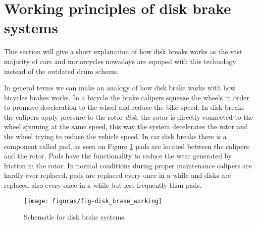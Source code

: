 \section{Working principles of disk brake systems}

		This section will give a short explanation of how disk breaks works as the vast majority of cars and motorcycles nowadays are equiped with this technology instead of the outdated drum scheme.
		\par
		In general terms we can make an analogy of how disk brake works with how bicycles brakes works. In a bicycle the brake calipers squeeze the wheels in order to promove deceleration to the wheel and reduce the bike speed. In disk breaks the calipers apply pressure to the rotor \textit{disk}, the rotor is directly connected to the wheel spinning at the same speed, this way the system decelerates the rotor and the wheel trying to reduce the vehicle speed. In car disk breaks there is a component called pad, as seen on Figure \ref{fig:working-of-disk-breaks} pads are located between the calipers and the rotor. Pads have the functionality to reduce the wear generated by friction in the rotor. In normal conditions during proper maintenance calipers are hardly-ever replaced, pads are replaced every once in a while and disks are replaced also every once in a while but less frequently than pads.

		\begin{figure}[htbp]
			\centering
				\texttt{[image: figuras/fig-disk\_brake\_working]}
			\caption{Schematic for disk brake systems \cite{fig-working-of-disk-breaks}}
			\label{fig:working-of-disk-breaks}
		\end{figure}

